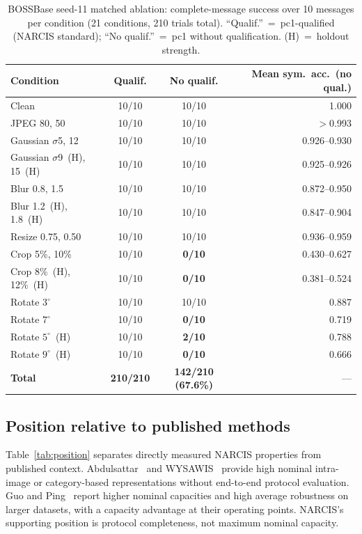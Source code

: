 ﻿\documentclass[10pt,journal]{IEEEtran}
\newcommand{\method}{NARCIS\xspace}
\begin{document}
\begin{table}[t]
\centering
\caption{BOSSBase seed-11 matched ablation: complete-message success over 10 messages
  per condition (21 conditions, 210 trials total). ``Qualif.''~=~pc1-qualified
  (\method standard); ``No qualif.''~=~pc1 without qualification. (H)~=~holdout strength.}
\label{tab:ablation_boss}
\small
\begin{tabular}{lccr}
\toprule
Condition & Qualif. & No qualif. & Mean sym.\ acc.\ (no qual.)\\
\midrule
Clean                      & 10/10 & 10/10              & 1.000 \\
JPEG 80, 50                & 10/10 & 10/10              & $>$0.993 \\
Gaussian $\sigma$5, 12     & 10/10 & 10/10              & 0.926--0.930 \\
Gaussian $\sigma$9~(H), 15~(H) & 10/10 & 10/10         & 0.925--0.926 \\
Blur 0.8, 1.5              & 10/10 & 10/10              & 0.872--0.950 \\
Blur 1.2~(H), 1.8~(H)     & 10/10 & 10/10              & 0.847--0.904 \\
Resize 0.75, 0.50          & 10/10 & 10/10              & 0.936--0.959 \\
Crop 5\%, 10\%             & 10/10 & \textbf{0/10}      & 0.430--0.627 \\
Crop 8\%~(H), 12\%~(H)    & 10/10 & \textbf{0/10}      & 0.381--0.524 \\
Rotate $3^\circ$           & 10/10 & 10/10              & 0.887 \\
Rotate $7^\circ$           & 10/10 & \textbf{0/10}      & 0.719 \\
Rotate $5^\circ$~(H)       & 10/10 & \textbf{2/10}      & 0.788 \\
Rotate $9^\circ$~(H)       & 10/10 & \textbf{0/10}      & 0.666 \\
\midrule
\textbf{Total}             & \textbf{210/210} & \textbf{142/210 (67.6\%)} & --- \\
\bottomrule
\end{tabular}
\end{table}

\subsection{Position relative to published methods}

Table~\ref{tab:position} separates directly measured \method properties
from published context. Abdulsattar~\cite{abdulsattar2021} and
WYSAWIS~\cite{wysawis2025} provide high nominal intra-image or
category-based representations without end-to-end protocol evaluation.
Guo and Ping~\cite{guo2026capacity} report higher nominal capacities
and high average robustness on larger datasets, with a capacity
advantage at their operating points. \method's supporting position is
protocol completeness, not maximum nominal capacity.
\end{document}
